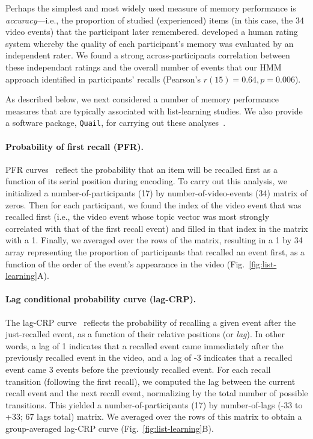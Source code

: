 \documentclass{article}
\begin{document}
Perhaps the simplest and most widely used measure of memory performance is \textit{accuracy}---i.e., the proportion of studied (experienced) items (in this case, the 34 video events) that the participant later remembered.  \cite{ChenEtal17} developed a human rating system whereby the quality of each participant's memory was evaluated by an independent rater.  We found a strong across-participants correlation between these independant ratings and the overall number of events that our HMM approach identified in participants' recalls (Pearson's $r(15) = 0.64, p = 0.006$).

As described below, we next considered a number of memory performance measures that are typically associated with list-learning studies.  We also provide a software package, \texttt{Quail}, for carrying out these analyses~\citep{HeusEtal17b}.

\paragraph{Probability of first recall (PFR).}  PFR curves~\citep{WelcBurn24, PostPhil65, AtkiShif68} reflect the probability that an item will be recalled first as a function of its serial position during encoding. To carry out this analysis, we initialized a number-of-participants (17) by number-of-video-events (34) matrix of zeros. Then for each participant, we found the index of the video event that was recalled first (i.e., the video event whose topic vector was most strongly correlated with that of the first recall event) and filled in that index in the matrix with a 1.  Finally, we averaged over the rows of the matrix, resulting in a 1 by 34 array representing the proportion of participants that recalled an event first, as a function of the order of the event's appearance in the video (Fig.~\ref{fig:list-learning}A).

\paragraph{Lag conditional probability curve (lag-CRP).} The lag-CRP curve~\citep{Kaha96} reflects the probability of recalling a given event after the just-recalled event, as a function of their relative positions (or \textit{lag}).  In other words, a lag of 1 indicates that a recalled event came immediately after the previously recalled event in the video, and a lag of -3 indicates that a recalled event came 3 events before the previously recalled event.  For each recall transition (following the first recall), we computed the lag between the current recall event and the next recall event, normalizing by the total number of possible transitions.  This yielded a number-of-participants (17) by number-of-lags (-33 to +33; 67 lags total) matrix. We averaged over the rows of this matrix to obtain a group-averaged lag-CRP curve (Fig.~\ref{fig:list-learning}B).
\end{document}

